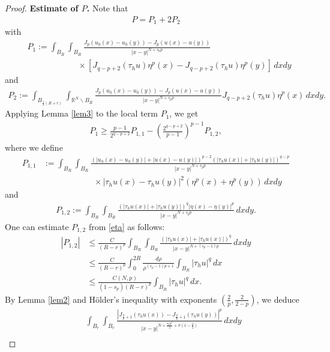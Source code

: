 \documentclass[reqno,10pt]{amsart}
\numberwithin{equation}{section}
\begin{document}
\begin{proof}
	\noindent \textbf{Estimate of $P$.}	Note that
	\begin{align}
		\label{9.5}
		P=P_1+2P_2
	\end{align}
	with
	\begin{align*}
		&P_1:=\int_{B_R}\int_{B_R}\frac{J_p(u_h(x)-u_h(y))-J_p(u(x)-u(y))}{|x-y|^{N+s_pp}}\\
		&\qquad\qquad\qquad\times\left[ J_{q-p+2}(\tau_hu)\eta^p(x)-J_{q-p+2}(\tau_hu)\eta^p(y)\right]\,dxdy
	\end{align*}
	and
	\begin{align*}
		P_2:=\int_{B_{\frac{1}{2}(R+r)}}\int_{\mathbb{R}^N\backslash B_R}\frac{J_p(u_h(x)-u_h(y))-J_p(u(x)-u(y))}{|x-y|^{N+s_pp}}J_{q-p+2}(\tau_hu)\eta^p(x)\,dxdy.
	\end{align*}
	Applying Lemma \ref{lem3} to the local term $P_1$, we get
	\begin{align}
		\label{9.6}
		P_1\ge\frac{p-1}{2^{q-p+2}}P_{1,1}-\left( \frac{2^{q-p+2}}{p-1}\right)^{p-1}P_{1,2},
	\end{align}
	where we define
	\begin{align*}
		P_{1,1}&:=\int_{B_R}\int_{B_R}\frac{\left( |u_h(x)-u_h(y)|+|u(x)-u(y)|\right)^{p-2}\left( |\tau_hu(x)|+|\tau_hu(y)|\right)^{q-p} }{|x-y|^{N+s_pp}}\nonumber\\
		&\qquad\qquad\qquad\times|\tau_hu(x)-\tau_hu(y)|^2\left( \eta^p(x)+\eta^p(y)\right)\,dxdy
	\end{align*}
	and
	\begin{align*}
		P_{1,2}:=\int_{B_R}\int_{B_R}\frac{\left( |\tau_hu(x)|+|\tau_hu(y)|\right)^q|\eta(x)-\eta(y)|^p }{|x-y|^{N+s_pp}}\,dxdy.
	\end{align*}
	One can estimate $P_{1,2}$ from \eqref{eta} as follows:
	\begin{align}
		\label{9.7}
		|P_{1,2}|&\le \frac{C}{(R-r)^p}\int_{B_R}\int_{B_R}\frac{\left( |\tau_hu(x)|+|\tau_hu(x)|\right)^q }{|x-y|^{N+(s_p-1)p}}\,dxdy\nonumber\\
		&\le \frac{C}{(R-r)^p}\int^{2R}_0\frac{d\rho}{\rho^{(s_p-1)p+1}}\int_{B_R}|\tau_hu|^q\,dx\nonumber\\
		&\le \frac{C(N,p)}{(1-s_p)(R-r)^p}\int_{B_R}|\tau_hu|^q\,dx.
	\end{align}
	By Lemma \ref{lem2} and H\"{o}lder's inequality with exponents $\left( \frac{2}{p},\frac{2}{2-p}\right) $, we deduce
	\begin{align}
		\label{9.8}
		&\quad\int_{B_r}\int_{B_r}\frac{\left| J_{\frac{q}{p}+1}\left( \tau_hu(x)\right)-J_{\frac{q}{p}+1}\left( \tau_hu(y)\right) \right|^p }{|x-y|^{N+\frac{s_pp^2}{2}+\sigma\left( 1-\frac{p}{2}\right) }}\,dxdy\nonumber\\

\end{align}
\end{proof}
\end{document}
